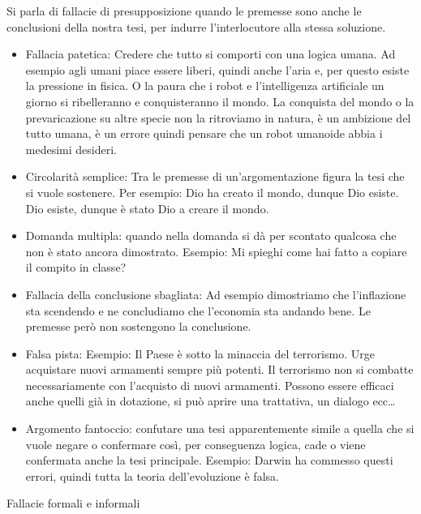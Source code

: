 \documentclass[12pt]{book} %
\begin{document}
Si parla di fallacie di presupposizione quando le premesse sono anche le conclusioni della nostra tesi, per indurre
l'interlocutore alla stessa soluzione.

\begin{itemize}
\item Fallacia patetica: Credere che tutto si comporti con una logica umana. Ad esempio agli umani piace essere liberi,
quindi anche l'aria e, per questo esiste la pressione in fisica. O la paura che i robot e
l'intelligenza artificiale un giorno si ribelleranno e conquisteranno il mondo. La conquista del
mondo o la prevaricazione su altre specie non la ritroviamo in natura, è un ambizione del tutto umana, è un errore
quindi pensare che un robot umanoide abbia i medesimi desideri.
\item Circolarità semplice: Tra le premesse di un'argomentazione figura la tesi che si vuole sostenere. Per esempio: Dio
ha creato il mondo, dunque Dio esiste. Dio esiste, dunque è stato Dio a creare il mondo.
\item Domanda multipla: quando nella domanda si dà per scontato qualcosa che non è stato ancora dimostrato. Esempio: Mi
spieghi come hai fatto a copiare il compito in classe?
\item Fallacia della conclusione sbagliata: Ad esempio dimostriamo che l'inflazione sta scendendo e
ne concludiamo che l'economia sta andando bene. Le premesse però non sostengono la conclusione.
\item Falsa pista: Esempio: Il Paese è sotto la minaccia del terrorismo. Urge acquistare nuovi armamenti sempre più
potenti. Il terrorismo non si combatte necessariamente con l'acquisto di nuovi armamenti. Possono essere efficaci anche
quelli già in dotazione, si può aprire una trattativa, un dialogo ecc…
\item Argomento fantoccio: confutare una tesi apparentemente simile a quella che si vuole negare o confermare così, per
conseguenza logica, cade o viene confermata anche la tesi principale. Esempio: Darwin ha commesso questi errori, quindi
tutta la teoria dell'evoluzione è falsa.
\end{itemize}

\bigskip

Fallacie formali e informali
\end{document}
